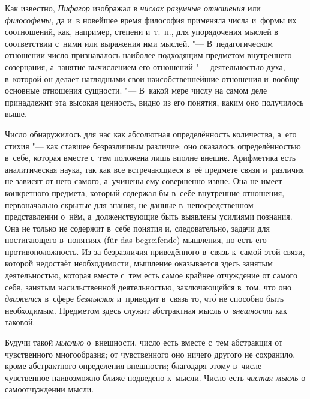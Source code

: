 Как известно, {\em Пифагор} изображал в {\em числах разумные отношения} или
{\em философемы,} да и~в новейшее время философия применяла числа и~формы их
соотношений, как, например, степени и~т.~п., для упорядочения мыслей в
соответствии с~ними или выражения ими мыслей. "--- В~педагогическом отношении число признавалось
наиболее подходящим предметом внутреннего созерцания, а~занятие вычислением его
отношений "--- деятельностью духа, в~которой он делает наглядными свои
наисобственнейшие отношения и~вообще основные отношения сущности. "--- В~какой
мере числу на самом деле принадлежит эта высокая ценность, видно из его
понятия, каким оно получилось выше.

Число обнаружилось для нас как абсолютная определённость количества, а~его
стихия "--- как ставшее безразличным различие; оно оказалось определённостью
в~себе, которая вместе с~тем положена лишь вполне внешне. Арифметика есть
аналитическая наука, так как все встречающиеся в~её предмете связи и~различия
не зависят от него самого, а~учинены ему совершенно извне. Она не имеет
конкретного предмета, который содержал бы в~себе внутренние отношения,
первоначально скрытые для знания, не данные в~непосредственном представлении
о~нём, а~долженствующие быть выявлены усилиями познания. Она не только не
содержит в~себе понятия и, следовательно, задачи для постигающего в~понятиях
(für das begrei\-fende) мышления, но есть его противоположность. Из-за
безразличия приведённого в~связь к~самой этой связи, которой недостаёт необходимости,
мышление оказывается здесь занятым деятельностью, которая вместе с~тем есть
самое крайнее отчуждение от самого себя, занятым насильственной деятельностью,
заключающейся в~том, что оно {\em движется} в~сфере {\em безмыслия} и~приводит
в~связь то, чт\'{о} не способно быть необходимым. Предметом здесь
служит абстрактная мысль о~{\em внешности} как таковой.

Будучи такой {\em мыслью} о~внешности, число есть вместе с~тем абстракция от
чувственного многообразия; от чувственного оно ничего другого не сохранило,
кроме абстрактного определения внешности; благодаря этому в~числе чувственное
наивозможно ближе подведено к~мысли. Число есть {\em чистая мысль} о
самоотчуждении мысли.

